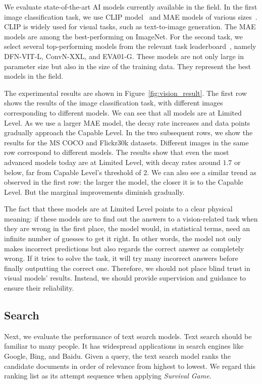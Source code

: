 We evaluate state-of-the-art AI models currently available in the field. In the first image classification task, we use CLIP model~\citep{radford2021learning} and MAE models of various sizes~\citep{he2022masked}. CLIP is widely used for visual tasks, such as text-to-image generation. The MAE models are among the best-performing on ImageNet. For the second task, we select several top-performing models from the relevant task leaderboard~\citep{ilharco2021openclip}, namely DFN-VIT-L, ConvN-XXL, and EVA01-G. These models are not only large in parameter size but also in the size of the training data. They represent the best models in the field.



The experimental results are shown in Figure~\ref{fig:vision_result}. 
The first row shows the results of the image classification task, with different images corresponding to different models. We can see that all models are at Limited Level. As we use a larger MAE model, the decay rate increases and data points gradually approach the Capable Level. In the two subsequent rows, we show the results for the MS COCO and Flickr30k datasets. Different images in the same row correspond to different models. The results show that even the most advanced models today are at Limited Level, with decay rates around $1.7$ or below, far from Capable Level's threshold of $2$. We can also see a similar trend as observed in the first row: the larger the model, the closer it is to the Capable Level. But the marginal improvements diminish gradually. 

The fact that these models are at Limited Level points to a clear physical meaning: if these models are to find out the answers to a vision-related task when they are wrong in the first place, the model would, in statistical terms, need an infinite number of guesses to get it right. In other words, the model not only makes incorrect predictions but also regards the correct answer as completely wrong. If it tries to solve the task, it will try many incorrect answers before finally outputting the correct one. 
Therefore, we should not place blind trust in visual models' results. Instead, we should provide supervision and guidance to ensure their reliability.

\subsection{Search}


Next, we evaluate the performance of text search models. Text search should be familiar to many people. It has widespread applications in search engines like Google, Bing, and Baidu. Given a query, the text search model ranks the candidate documents in order of relevance from highest to lowest. We regard this ranking list as its attempt sequence when applying \textit{Survival Game}.

